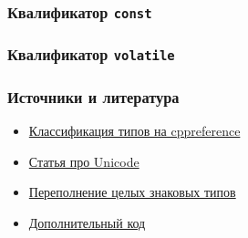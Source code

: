 \documentclass[compress, 8pt]{beamer}
\begin{document}
\begin{frame}[fragile]

    \frametitle{Квалификатор \texttt{const}}

\end{frame}

\begin{frame}[fragile]

    \frametitle{Квалификатор \texttt{volatile}}

\end{frame}

\begin{frame}

    \frametitle{Источники и литература}

    \begin{itemize}

        \item \href{https://en.cppreference.com/w/cpp/language/type}
            {Классификация типов на cppreference}
        \item \href{https://habr.com/ru/companies/wunderfund/articles/777850/}
            {Статья про Unicode}
        \item \href{https://github.com/Nekrolm/ubbook/blob/master/numeric/overflow.md}
            {Переполнение целых знаковых типов}
        \item \href{https://ru.wikipedia.org/wiki/\%D0\%94\%D0\%BE\%D0\%BF\%D0\%BE\%D0\%BB\%D0\%BD\%D0\%B8\%D1\%82\%D0\%B5\%D0\%BB\%D1\%8C\%D0\%BD\%D1\%8B\%D0\%B9_\%D0\%BA\%D0\%BE\%D0\%B4}
            {Дополнительный код}

    \end{itemize}

\end{frame}
\end{document}
